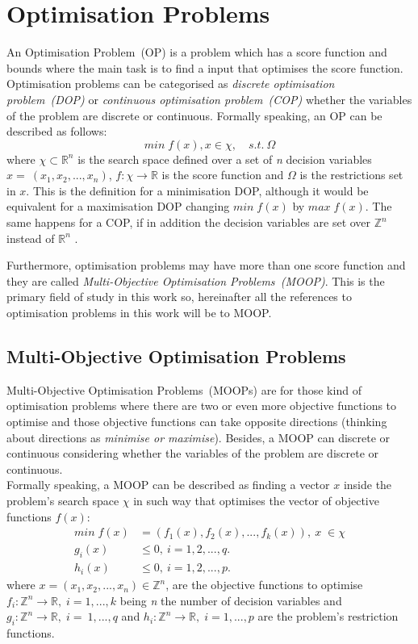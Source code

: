 \section{Optimisation Problems}
An Optimisation Problem~(OP) is a problem which has a score function and bounds where the main task is to find a input that optimises the score function. Optimisation problems can be categorised as \textit{discrete optimisation problem~(DOP)} or \textit{continuous optimisation problem~(COP)} whether the variables of the problem are discrete or continuous. 
Formally speaking, an OP can be described as follows:
\begin{equation*}
min\;f(x), x \in \chi,\quad s.t.\:\Omega
\end{equation*}
where $\chi \subset\mathbb{R}^{n}$ is the search space defined over a set of \textit{n} decision variables  $x = ~(x_{1}, x_{2},..., x_{n})$, $f: \chi \rightarrow \mathbb{R}$ is the score function and $\Omega$ is the restrictions set in $x$. This is the definition for a minimisation DOP, although it would be equivalent for a maximisation DOP changing $min\;f(x)$ by $max\;f(x)$. The same happens for a COP, if in addition the decision variables are set over $\mathbb{Z}^{n}$ instead of $\mathbb{R}^{n}$ .

Furthermore, optimisation problems may have more than one score function and they are called \textit{Multi-Objective Optimisation Problems~(MOOP)}. This is the primary field of study in this work so, hereinafter all the references to optimisation problems in this work will be to MOOP.
\newpage
\subsection{Multi-Objective Optimisation Problems}

Multi-Objective Optimisation Problems~(MOOPs) are for those kind of optimisation problems where there are  two or even more objective functions to optimise and those objective functions can take opposite directions (thinking about directions as \textit{minimise or maximise}). Besides, a MOOP can discrete or continuous considering whether the variables of the problem are discrete or continuous. \\
Formally speaking, a MOOP can be described as finding a vector \textbf{$x$} inside the problem's search space \textit{$\chi$} in such way that optimises the vector of objective functions \textit{$f(x)$}\cite{search}:
\begin{align*}
min\;f(x) & = (f_{1}(x), f_{2}(x), ..., f_{k}(x)), \: x\;\in\chi \\
 g_{i}(x) & \leq 0, \: i = 1, 2, ..., q. \\
 h_{i}(x) & \leq 0, \: i = 1, 2, ..., p.
\end{align*}
where $x = (x_{1}, x_{2}, ..., x_{n}) \in \mathbb{Z}^{n}$, are the objective functions to optimise $f_{i}: \mathbb{Z}^{n} \rightarrow \mathbb{R}, \; i = 1, ..., k$ being \textit{n} the number of decision variables and $g_{i}: \mathbb{Z}^{n} \rightarrow \mathbb{R}, \; i = ~1, ..., q$ and $h_{i}: \mathbb{Z}^{n} \rightarrow \mathbb{R}, \; i = 1, ..., p$ are the problem's restriction functions.

